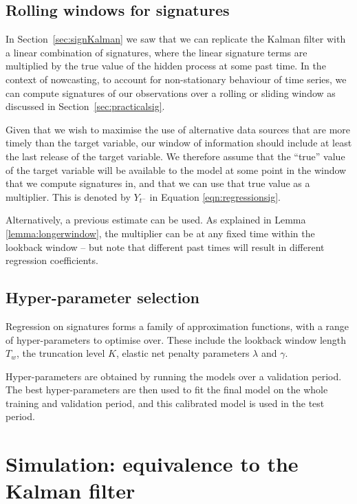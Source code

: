 \documentclass[a4paper, 12pt]{article}
\theoremstyle{remark}
\begin{document}
\subsection{Rolling windows for signatures}

In Section~\ref{sec:signKalman} we saw that we can replicate the Kalman filter with a linear combination of signatures, where the linear signature terms are multiplied by the true value of the hidden process at some past time. In the context of nowcasting, to account for non-stationary behaviour of time series, we can compute signatures of our observations over a rolling or sliding window as discussed in  Section~\ref{sec:practicalsig}. 

Given that we wish to maximise the use of alternative data sources that are more timely than the target variable, our window of information should include at least the last release of the target variable. We therefore assume that the ``true'' value of the target variable will be available to the model at some point in the window that we compute signatures in, and that we can use that true value as a multiplier. This is denoted by \(Y_{t^-}\) in Equation \eqref{eqn:regressionsig}. 

Alternatively, a previous estimate can be used. As explained in Lemma \ref{lemma:longerwindow}, the multiplier can be at any fixed time within the lookback window -- but note that different past times will result in different regression coefficients.

\subsection{Hyper-parameter selection}
Regression on signatures forms a family of approximation functions, with a range of hyper-parameters to optimise over. These include the lookback window length $T_w$, the truncation level $K$, elastic net penalty parameters \(\lambda\) and \(\gamma\).

Hyper-parameters are obtained by running the models over a validation period. The best hyper-parameters are then used to fit the final model on the whole training and validation period, and this calibrated model is used in the test period.
\section{Simulation: equivalence to the Kalman filter}\label{sec:simulation}
\end{document}
